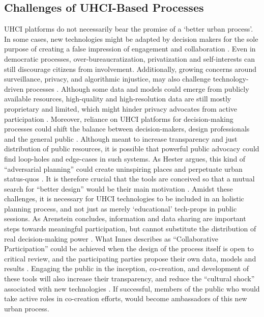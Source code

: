 {{      \subsection{Challenges of UHCI-Based Processes}\label{intro:challanges-processes}

      {
          UHCI platforms do not necessarily bear the promise of a `better urban process'. In some cases, new technologies might be adapted by decision makers for the sole purpose of creating a false impression of engagement and collaboration \cite{Innes2016, banerjee2011companion}. Even in democratic processes, over-bureaucratization, privatization and self-interests can still discourage citizens from involvement.
          Additionally, growing concerns around surveillance, privacy, and algorithmic injustice, may also challenge technology-driven processes \cite{green2019smart}. Although some data and models could emerge from publicly available resources, high-quality and high-resolution data are still mostly proprietary and limited, which might hinder privacy advocates from active participation \cite{Barbosa-Filho2017}.
          \newline
          Moreover, reliance on UHCI platforms for decision-making processes could shift the balance between decision-makers, design professionals and the general public \cite{ben-joseph2001, mueller2018citizen}. Although meant to increase transparency and just distribution of public resources, it is possible that powerful public advocacy could find loop-holes and edge-cases in such systems. As Hester argues, this kind of ``adversarial planning'' could create uninspiring places and perpetuate urban status-quos \cite{hester2006design}. It is therefore crucial that the tools are conceived so that a mutual search for ``better design'' would be their main motivation \cite{banerjee2011companion}.
          \newline
          Amidst these challenges, it is necessary for UHCI technologies to be included in an holistic planning process, and not just as merely `educational' tech-props in public sessions. As Arenstein concludes, information and data sharing are important steps towards meaningful participation, but cannot substitute the distribution of real decision-making power \cite{arnstein1969ladder}. What Innes describes as ``Collaborative Participation'' could be achieved when the design of the process itself is open to critical review, and the participating parties propose their own data, models and results \cite{Innes2016}. Engaging the public in the inception, co-creation, and development of these tools will also increase their transparency, and reduce the ``cultural shock'' associated with new technologies \cite{banerjee2011companion}. If successful, members of the public who would take active roles in co-creation efforts, would become ambassadors of this new urban process.
      }
     }

}
